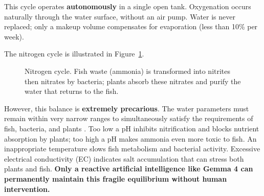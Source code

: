\documentclass[12pt,a4paper]{article}
\begin{document}
This cycle operates \textbf{autonomously} in a single open tank. Oxygenation occurs naturally through the water surface, without an air pump. Water is never replaced; only a makeup volume compensates for evaporation (less than 10\% per week).

The nitrogen cycle is illustrated in Figure~\ref{fig:cycle_azote}.

\begin{figure}[H]
\centering
{}
\caption{Nitrogen cycle. Fish waste (ammonia) is transformed into nitrites then nitrates by bacteria; plants absorb these nitrates and purify the water that returns to the fish.}
\label{fig:cycle_azote}
\end{figure}

However, this balance is \textbf{extremely precarious}. The water parameters must remain within very narrow ranges to simultaneously satisfy the requirements of fish, bacteria, and plants \cite{waterquality2020}. Too low a pH inhibits nitrification and blocks nutrient absorption by plants; too high a pH makes ammonia even more toxic to fish. An inappropriate temperature slows fish metabolism and bacterial activity. Excessive electrical conductivity (EC) indicates salt accumulation that can stress both plants and fish. \textbf{Only a reactive artificial intelligence like Gemma 4 can permanently maintain this fragile equilibrium without human intervention.}
\end{document}
